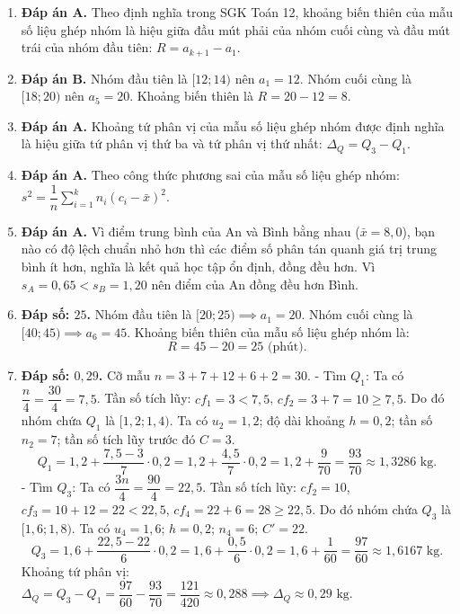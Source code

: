 \documentclass[12pt,a4paper]{article}
\begin{document}
\begin{enumerate}
\item \textbf{Đáp án A.}  
Theo định nghĩa trong SGK Toán 12, khoảng biến thiên của mẫu số liệu ghép nhóm là hiệu giữa đầu mút phải của nhóm cuối cùng và đầu mút trái của nhóm đầu tiên: $R = a_{k+1} - a_1$.

\item \textbf{Đáp án B.}  
Nhóm đầu tiên là $[12; 14)$ nên $a_1 = 12$. Nhóm cuối cùng là $[18; 20)$ nên $a_5 = 20$.  
Khoảng biến thiên là $R = 20 - 12 = 8$.

\item \textbf{Đáp án A.}  
Khoảng tứ phân vị của mẫu số liệu ghép nhóm được định nghĩa là hiệu giữa tứ phân vị thứ ba và tứ phân vị thứ nhất: $\Delta_Q = Q_3 - Q_1$.

\item \textbf{Đáp án A.}  
Theo công thức phương sai của mẫu số liệu ghép nhóm: $s^2 = \dfrac{1}{n}\sum\limits_{i=1}^k n_i (c_i - \bar{x})^2$.

\item \textbf{Đáp án A.}  
Vì điểm trung bình của An và Bình bằng nhau ($\bar{x} = 8{,}0$), bạn nào có độ lệch chuẩn nhỏ hơn thì các điểm số phân tán quanh giá trị trung bình ít hơn, nghĩa là kết quả học tập ổn định, đồng đều hơn. Vì $s_A = 0{,}65 < s_B = 1{,}20$ nên điểm của An đồng đều hơn Bình.

\item \textbf{Đáp số: $25$.}  
Nhóm đầu tiên là $[20; 25) \implies a_1 = 20$.  
Nhóm cuối cùng là $[40; 45) \implies a_6 = 45$.  
Khoảng biến thiên của mẫu số liệu ghép nhóm là:  
\[
R = 45 - 20 = 25\text{ (phút)}.
\]

\item \textbf{Đáp số: $0{,}29$.}  
Cỡ mẫu $n = 3 + 7 + 12 + 6 + 2 = 30$.  
- Tìm $Q_1$: Ta có $\dfrac{n}{4} = \dfrac{30}{4} = 7{,}5$.  
Tần số tích lũy: $cf_1 = 3 < 7{,}5$, $cf_2 = 3 + 7 = 10 \ge 7{,}5$.  
Do đó nhóm chứa $Q_1$ là $[1{,}2; 1{,}4)$. Ta có $u_2 = 1{,}2$; độ dài khoảng $h = 0{,}2$; tần số $n_2 = 7$; tần số tích lũy trước đó $C = 3$.  
\[
Q_1 = 1{,}2 + \dfrac{7{,}5 - 3}{7} \cdot 0{,}2 = 1{,}2 + \dfrac{4{,}5}{7} \cdot 0{,}2 = 1{,}2 + \dfrac{9}{70} = \dfrac{93}{70} \approx 1{,}3286\text{ kg}.
\]
- Tìm $Q_3$: Ta có $\dfrac{3n}{4} = \dfrac{90}{4} = 22{,}5$.  
Tần số tích lũy: $cf_2 = 10$, $cf_3 = 10 + 12 = 22 < 22{,}5$, $cf_4 = 22 + 6 = 28 \ge 22{,}5$.  
Do đó nhóm chứa $Q_3$ là $[1{,}6; 1{,}8)$. Ta có $u_4 = 1{,}6$; $h = 0{,}2$; $n_4 = 6$; $C' = 22$.  
\[
Q_3 = 1{,}6 + \dfrac{22{,}5 - 22}{6} \cdot 0{,}2 = 1{,}6 + \dfrac{0{,}5}{6} \cdot 0{,}2 = 1{,}6 + \dfrac{1}{60} = \dfrac{97}{60} \approx 1{,}6167\text{ kg}.
\]
Khoảng tứ phân vị: $\Delta_Q = Q_3 - Q_1 = \dfrac{97}{60} - \dfrac{93}{70} = \dfrac{121}{420} \approx 0{,}288 \implies \Delta_Q \approx 0{,}29\text{ kg}$.


\end{enumerate}
\end{document}
